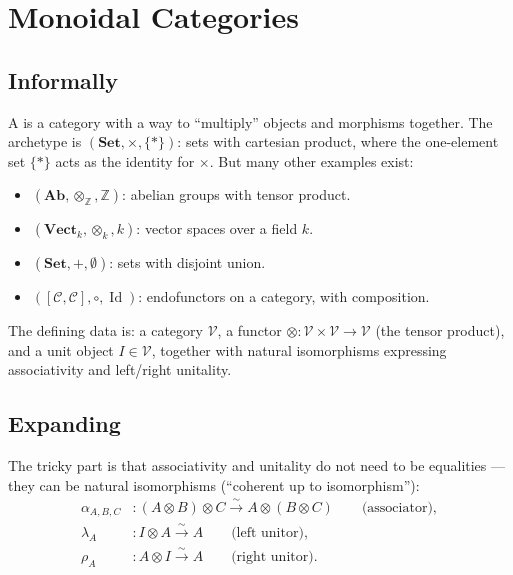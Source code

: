 \section{Monoidal Categories}

\subsection{Informally}

A  is a category with a way to ``multiply'' objects
and morphisms together. The archetype is $(\mathbf{Set}, \times, \{*\})$: sets
with cartesian product, where the one-element set $\{*\}$ acts as the identity
for $\times$. But many other examples exist:

\begin{itemize}
  \item $(\mathbf{Ab}, \otimes_{\mathbb{Z}}, \mathbb{Z})$: abelian groups with tensor product.
  \item $(\mathbf{Vect}_k, \otimes_k, k)$: vector spaces over a field $k$.
  \item $(\mathbf{Set}, +, \emptyset)$: sets with disjoint union.
  \item $([\mathcal{C}, \mathcal{C}], \circ, \operatorname{Id})$: endofunctors on a
    category, with composition.
\end{itemize}

The defining data is: a category $\mathcal{V}$, a functor
$\otimes : \mathcal{V} \times \mathcal{V} \to \mathcal{V}$ (the tensor product),
and a unit object $I \in \mathcal{V}$, together with natural isomorphisms
expressing associativity and left/right unitality.

\subsection{Expanding}

The tricky part is that associativity and unitality do not need to be equalities —
they can be natural isomorphisms (``coherent up to isomorphism''):
\begin{align*}
  \alpha_{A,B,C} &: (A \otimes B) \otimes C \xrightarrow{\sim} A \otimes (B \otimes C)
    \qquad \text{(associator)}, \\
  \lambda_A &: I \otimes A \xrightarrow{\sim} A
    \qquad \text{(left unitor)}, \\
  \rho_A &: A \otimes I \xrightarrow{\sim} A
    \qquad \text{(right unitor)}.
\end{align*}

